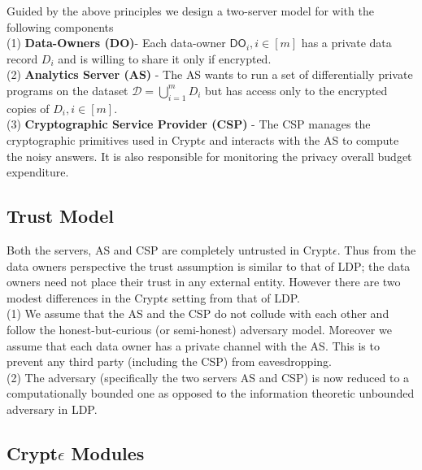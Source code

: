 Guided by the above principles we design a two-server model for \system with the following components
\\(1)\textbf{ Data-Owners (\textsf{DO})}-  Each data-owner $\textsf{DO}_i, i \in [m]$ has  a
private data record $D_i$ and is willing to share it only if encrypted.   \\(2)\textbf{ Analytics Server (\textsf{AS})} - The \textsf{AS} wants to run a set of differentially private programs on the dataset $\mathcal{D}=\bigcup_{i=1}^m D_i$  but has 
access only to the encrypted copies of $D_i, i \in [m]$.
\\(3)\textbf{ Cryptographic Service Provider (\textsf{CSP})} -
 The \textsf{CSP} manages the cryptographic primitives used in Crypt$\epsilon$ and interacts with the \textsf{AS} to compute the
noisy answers. It is also responsible for monitoring the privacy overall budget expenditure.
\subsection{Trust Model}
Both the servers, \textsf{AS} and \textsf{CSP} are completely untrusted in Crypt$\epsilon$. 
Thus from the data owners perspective the trust assumption is similar to that of \textsf{LDP}; the data owners need not place their trust in any external entity. 
However there are two modest differences in the Crypt$\epsilon$ setting from that of \textsf{LDP}.\\
 (1) We assume that the \textsf{AS} and the \textsf{CSP} do not collude with each other and follow the honest-but-curious (or semi-honest) adversary model. %
 Moreover we assume that each data owner has a private channel with the \textsf{AS}. This is to prevent any third party (including the \textsf{CSP}) from eavesdropping. \\
 (2) The adversary (specifically the two servers \textsf{AS} and  \textsf{CSP}) is now reduced to a computationally bounded one as opposed to the information theoretic unbounded adversary  in \textsf{LDP}.
\subsection{Crypt$\epsilon$ Modules}


